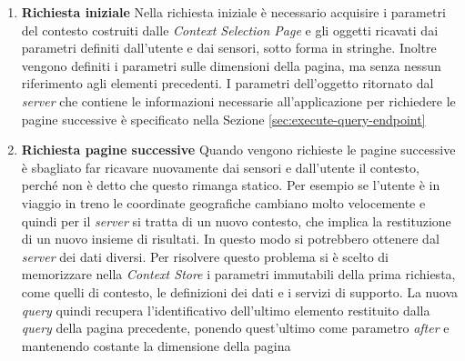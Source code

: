 \begin{enumerate}
	\item \textbf{Richiesta iniziale}
	Nella richiesta iniziale è necessario acquisire i parametri del contesto costruiti dalle \emph{Context Selection Page} e gli oggetti ricavati dai parametri definiti dall'utente e dai sensori, sotto forma in stringhe. Inoltre vengono definiti i parametri sulle dimensioni della pagina, ma senza nessun riferimento agli elementi precedenti.
	I parametri dell'oggetto ritornato dal \emph{server} che contiene le informazioni necessarie all'applicazione per richiedere le pagine successive è specificato nella Sezione \ref{sec:execute-query-endpoint}
	\item \textbf{Richiesta pagine successive}
	Quando vengono richieste le pagine successive è sbagliato far ricavare nuovamente dai sensori e dall'utente il contesto, perché non è detto che questo rimanga statico. Per esempio se l'utente è in viaggio in treno le coordinate geografiche cambiano molto velocemente e quindi per il \emph{server} si tratta di un nuovo contesto, che implica la restituzione di un nuovo insieme di risultati. In questo modo si potrebbero ottenere dal \emph{server} dei dati diversi. Per risolvere questo problema si è scelto di memorizzare nella \emph{Context Store} i parametri immutabili della prima richiesta, come quelli di contesto, le definizioni dei dati e i servizi di supporto. La nuova \emph{query} quindi recupera l'identificativo dell'ultimo elemento restituito dalla \emph{query} della pagina precedente, ponendo quest'ultimo come parametro \emph{after} e mantenendo costante la dimensione della pagina
\end{enumerate} 

